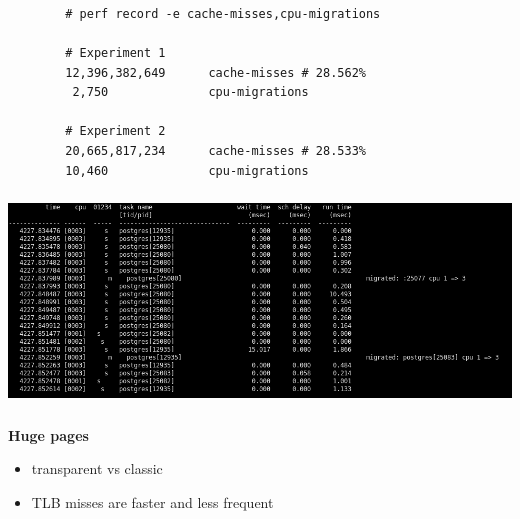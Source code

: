 \documentclass[usenames,dvipsnames, 18pt, compress, aspectratio=169]{beamer}
\begin{document}
\begin{frame}[fragile]{}
    \frametitle{}
    \begin{center}

        \begin{verbatim}
        # perf record -e cache-misses,cpu-migrations

        # Experiment 1
        12,396,382,649      cache-misses # 28.562%
         2,750              cpu-migrations

        # Experiment 2
        20,665,817,234      cache-misses # 28.533%
        10,460              cpu-migrations
        \end{verbatim}

    \end{center}
\end{frame}

\begin{frame}
    \frametitle{}
    \begin{center}

        \includegraphics[width=1.0\textwidth,center]{migrations.png}

    \end{center}
\end{frame}

\begin{frame}[fragile]{}
    \frametitle{}
    \begin{center}
        \textbf{Huge pages}

        \begin{itemize}[]
            \item transparent vs classic
			\item TLB misses are faster and less frequent
        \end{itemize}

    \end{center}
\end{frame}
\end{document}
